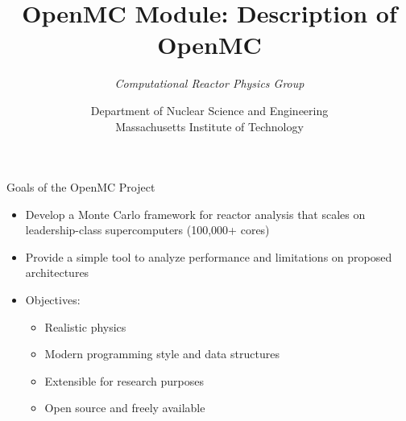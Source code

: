 \documentclass[serif]{beamer}
\title{OpenMC Module: Description of OpenMC}
\author{\emph{Computational Reactor Physics Group}}
\date{\normalsize Department of Nuclear Science and Engineering\\
                  Massachusetts Institute of Technology}
\begin{document}

\frame{\titlepage}\logo{} %


\begin{frame}{Goals of the OpenMC Project}
  \begin{itemize}
    \vfill
    \item<1-> Develop a Monte Carlo framework for reactor analysis that scales
      on leadership-class supercomputers (100,000+ cores)
    \vfill
    \item<1-> Provide a simple tool to analyze performance and limitations on
      proposed architectures
    \vfill
    \item<1-> Objectives:
      \begin{itemize}
      \item<1-> Realistic physics
      \item<1-> Modern programming style and data structures
      \item<1-> Extensible for research purposes
      \item<1-> Open source and freely available
      \vfill
      \end{itemize}
  \end{itemize}
\end{frame}

\end{document}
